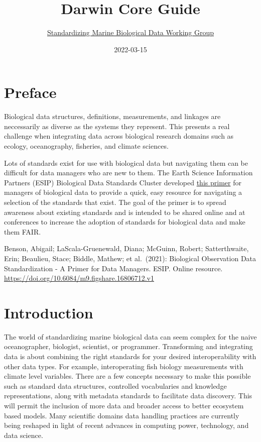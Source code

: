 \documentclass[
]{book}
\title{Darwin Core Guide}
\author{\href{https://github.com/ioos/bio_data_guide/graphs/contributors}{Standardizing Marine Biological Data Working Group}}
\date{2022-03-15}
\begin{document}
\maketitle

{
\setcounter{tocdepth}{1}
\tableofcontents
}
\hypertarget{preface}{%
\chapter*{Preface}\label{preface}}

Biological data structures, definitions, measurements, and linkages are neccessarily as diverse as the systems they represent. This presents a real challenge when integrating data across biological research domains such as ecology, oceanography, fisheries, and climate sciences.

Lots of standards exist for use with biological data but navigating them can be difficult for data managers who are new to them. The Earth Science Information Partners (ESIP) Biological Data Standards Cluster developed \href{https://doi.org/10.6084/m9.figshare.16806712.v1}{this primer} for managers of biological data to provide a quick, easy resource for navigating a selection of the standards that exist. The goal of the primer is to spread awareness about existing standards and is intended to be shared online and at conferences to increase the adoption of standards for biological data and make them FAIR.

Benson, Abigail; LaScala-Gruenewald, Diana; McGuinn, Robert; Satterthwaite, Erin; Beaulieu, Stace; Biddle, Mathew; et al.~(2021): Biological Observation Data Standardization - A Primer for Data Managers. ESIP. Online resource. \url{https://doi.org/10.6084/m9.figshare.16806712.v1}

\hypertarget{intro}{%
\chapter{Introduction}\label{intro}}

The world of standardizing marine biological data can seem complex for the naive oceanographer, biologist, scientist, or programmer.
Transforming and integrating data is about combining the right standards for your desired interoperability with other data types.
For example, interoperating fish biology measurements with climate level variables.
There are a few concepts necessary to make this possible such as standard data structures, controlled vocabularies and knowledge representations, along with metadata standards to facilitate data discovery. This will permit the inclusion of more data and broader access to better ecosystem based models. Many scientific domains data handling practices are currently being reshaped in light of recent advances in computing power, technology, and data science.
\end{document}
